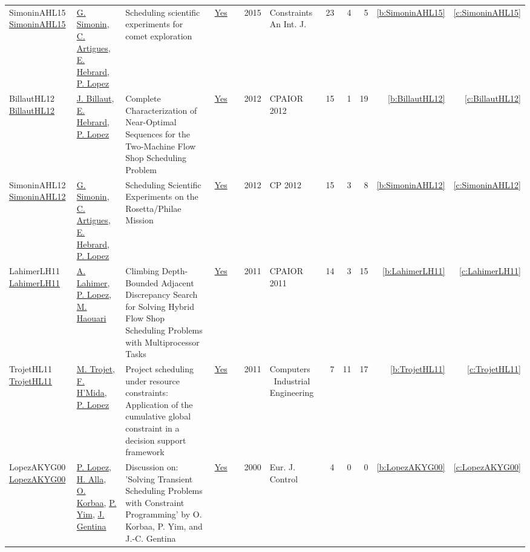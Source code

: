 {\begin{longtable}{>{\raggedright\arraybackslash}p{3cm}>{\raggedright\arraybackslash}p{6cm}>{\raggedright\arraybackslash}p{6.5cm}rrrp{2.5cm}rrrrr}
SimoninAHL15 \href{https://doi.org/10.1007/s10601-014-9169-3}{SimoninAHL15} & \hyperref[auth:a127]{G. Simonin}, \hyperref[auth:a6]{C. Artigues}, \hyperref[auth:a1]{E. Hebrard}, \hyperref[auth:a3]{P. Lopez} & Scheduling scientific experiments for comet exploration & \href{../works/SimoninAHL15.pdf}{Yes} & \cite{SimoninAHL15} & 2015 & Constraints An Int. J. & 23 & 4 & 5 & \ref{b:SimoninAHL15} & \ref{c:SimoninAHL15}\\
BillautHL12 \href{https://doi.org/10.1007/978-3-642-29828-8\_5}{BillautHL12} & \hyperref[auth:a343]{J. Billaut}, \hyperref[auth:a1]{E. Hebrard}, \hyperref[auth:a3]{P. Lopez} & Complete Characterization of Near-Optimal Sequences for the Two-Machine Flow Shop Scheduling Problem & \href{../works/BillautHL12.pdf}{Yes} & \cite{BillautHL12} & 2012 & CPAIOR 2012 & 15 & 1 & 19 & \ref{b:BillautHL12} & \ref{c:BillautHL12}\\
SimoninAHL12 \href{https://doi.org/10.1007/978-3-642-33558-7\_5}{SimoninAHL12} & \hyperref[auth:a127]{G. Simonin}, \hyperref[auth:a6]{C. Artigues}, \hyperref[auth:a1]{E. Hebrard}, \hyperref[auth:a3]{P. Lopez} & Scheduling Scientific Experiments on the Rosetta/Philae Mission & \href{../works/SimoninAHL12.pdf}{Yes} & \cite{SimoninAHL12} & 2012 & CP 2012 & 15 & 3 & 8 & \ref{b:SimoninAHL12} & \ref{c:SimoninAHL12}\\
LahimerLH11 \href{https://doi.org/10.1007/978-3-642-21311-3\_12}{LahimerLH11} & \hyperref[auth:a355]{A. Lahimer}, \hyperref[auth:a3]{P. Lopez}, \hyperref[auth:a356]{M. Haouari} & Climbing Depth-Bounded Adjacent Discrepancy Search for Solving Hybrid Flow Shop Scheduling Problems with Multiprocessor Tasks & \href{../works/LahimerLH11.pdf}{Yes} & \cite{LahimerLH11} & 2011 & CPAIOR 2011 & 14 & 3 & 15 & \ref{b:LahimerLH11} & \ref{c:LahimerLH11}\\
TrojetHL11 \href{https://doi.org/10.1016/j.cie.2010.08.014}{TrojetHL11} & \hyperref[auth:a715]{M. Trojet}, \hyperref[auth:a716]{F. H'Mida}, \hyperref[auth:a3]{P. Lopez} & Project scheduling under resource constraints: Application of the cumulative global constraint in a decision support framework & \href{../works/TrojetHL11.pdf}{Yes} & \cite{TrojetHL11} & 2011 & Computers \  Industrial Engineering & 7 & 11 & 17 & \ref{b:TrojetHL11} & \ref{c:TrojetHL11}\\
LopezAKYG00 \href{https://doi.org/10.1016/S0947-3580(00)71114-9}{LopezAKYG00} & \hyperref[auth:a3]{P. Lopez}, \hyperref[auth:a693]{H. Alla}, \hyperref[auth:a690]{O. Korbaa}, \hyperref[auth:a691]{P. Yim}, \hyperref[auth:a692]{J. Gentina} & Discussion on: 'Solving Transient Scheduling Problems with Constraint Programming' by O. Korbaa, P. Yim, and {J.-C.} Gentina & \href{../works/LopezAKYG00.pdf}{Yes} & \cite{LopezAKYG00} & 2000 & Eur. J. Control & 4 & 0 & 0 & \ref{b:LopezAKYG00} & \ref{c:LopezAKYG00}\\

\end{longtable}}
